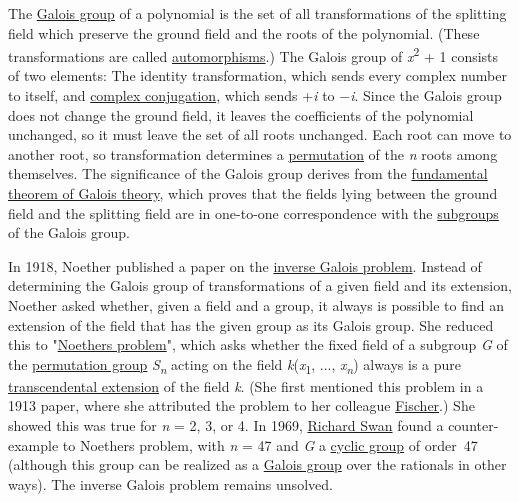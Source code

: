 The \href{https://en.wikipedia.org/wiki/Galois_group}{Galois group} of a polynomial is the set of all transformations of the splitting field which preserve the ground field and the roots of the polynomial. (These transformations are called \href{https://en.wikipedia.org/wiki/Automorphism}{automorphisms}.) The Galois group of {{\emph{x}\textsuperscript{2} + 1}} consists of two elements: The identity transformation, which sends every complex number to itself, and \href{https://en.wikipedia.org/wiki/Complex_conjugation}{complex conjugation}, which sends {+\emph{i}} to {−\emph{i}}. Since the Galois group does not change the ground field, it leaves the coefficients of the polynomial unchanged, so it must leave the set of all roots unchanged. Each root can move to another root, so transformation determines a \href{https://en.wikipedia.org/wiki/Permutation}{permutation} of the {\emph{n}} roots among themselves. The significance of the Galois group derives from the \href{https://en.wikipedia.org/wiki/Fundamental_theorem_of_Galois_theory}{fundamental theorem of Galois theory}, which proves that the fields lying between the ground field and the splitting field are in one-to-one correspondence with the \href{https://en.wikipedia.org/wiki/Subgroup}{subgroups} of the Galois group.

In 1918, Noether published a paper on the \href{https://en.wikipedia.org/wiki/Inverse_Galois_problem}{inverse Galois problem}. Instead of determining the Galois group of transformations of a given field and its extension, Noether asked whether, given a field and a group, it always is possible to find an extension of the field that has the given group as its Galois group. She reduced this to "\href{https://en.wikipedia.org/wiki/Noether's_problem}{Noether\textquotesingle s problem}", which asks whether the fixed field of a subgroup \emph{G} of the \href{https://en.wikipedia.org/wiki/Symmetric_group}{permutation group} {\emph{S}\textsubscript{\emph{n}}} acting on the field {\emph{k}(\emph{x}\textsubscript{1}, ..., \emph{x}\textsubscript{\emph{n}})} always is a pure \href{https://en.wikipedia.org/wiki/Transcendental_extension}{transcendental extension} of the field {\emph{k}}. (She first mentioned this problem in a 1913 paper, where she attributed the problem to her colleague \href{https://en.wikipedia.org/wiki/Ernst_Sigismund_Fischer}{Fischer}.) She showed this was true for {\emph{n}} = 2, 3, or 4. In 1969, \href{https://en.wikipedia.org/wiki/Richard_Swan}{Richard Swan} found a counter-example to Noether\textquotesingle s problem, with {\emph{n}} = 47 and {\emph{G}} a \href{https://en.wikipedia.org/wiki/Cyclic_group}{cyclic group} of order{~}47 (although this group can be realized as a \href{https://en.wikipedia.org/wiki/Galois_group}{Galois group} over the rationals in other ways). The inverse Galois problem remains unsolved.



